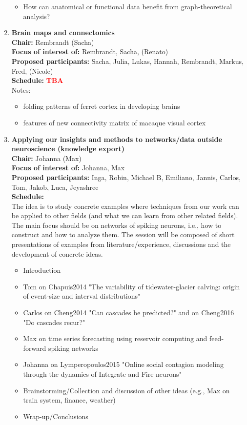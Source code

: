 \documentclass[10pt, a4paper,twoside,american]{article}
\newcommand{\alert}[1]{\textcolor{red}{\bf #1}}
\begin{document}
\begin{enumerate}[resume]
\begin{itemize}
  \item How can anatomical or functional data benefit from graph-theoretical analysis?
  \end{itemize}
\item {\large\bf Brain maps and connectomics}\\[1ex]
  {\bf Chair:} Rembrandt (Sacha)\\[1ex]
  {\bf Focus of interest of:} Rembrandt, Sacha, (Renato)\\[1ex]
  {\bf Proposed participants:} Sacha, Julia, Lukas, Hannah, Rembrandt, Markus, Fred, (Nicole)\\[1ex]
  {\bf Schedule:} \alert{TBA}\\[1ex]
  Notes:
  \begin{itemize}
  \item folding patterns of ferret cortex in developing brains
  \item features of new connectivity matrix of macaque visual cortex
  \end{itemize}
\item {\large\bf Applying our insights and methods to networks/data outside neuroscience (knowledge export)}\\[1ex]
  {\bf Chair:} Johanna (Max)\\[1ex]
  {\bf Focus of interest of:} Johanna, Max\\[1ex]
  {\bf Proposed participants:} Inga, Robin, Michael B, Emiliano, Jannis, Carlos, Tom, Jakob, Luca, Jeyashree\\[1ex]
  	{\bf Schedule:}\\[1ex]
	The idea is to study concrete examples where techniques from our
	work can be applied to other fields (and what we can learn from other
	related fields). The main focus should be on networks of spiking
	neurons, i.e., how to construct and how to analyze them.  The
	session will be composed of short presentations of examples 		from literature/experience, discussions and the development of concrete ideas.\\	
  	\begin{itemize}
  	\item Introduction
  	\item Tom on Chapuis2014 "The variability of tidewater-glacier calving: origin of event-size and interval distributions"
  	\item Carlos on Cheng2014 "Can cascades be predicted?" and on Cheng2016 "Do cascades recur?"
  	\item Max on time series forecasting using reservoir computing and feed-forward spiking networks
  	\item Johanna on Lymperopoulos2015 "Online social contagion modeling through the dynamics of Integrate-and-Fire neurons"
  	\item Brainstorming/Collection and discussion of other ideas (e.g., Max on train system, finance, weather)
  	\item Wrap-up/Conclusions
  \end{itemize}
\end{enumerate}
\end{document}
